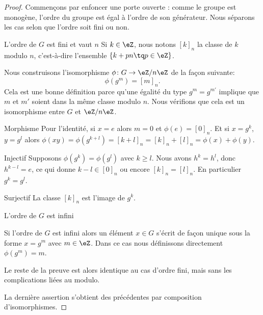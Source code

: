 \begin{proof}

    Commençons par enfoncer une porte ouverte : comme le groupe est monogène, l'ordre du groupe est égal à l'ordre de son générateur. Nous séparons les cas selon que l'ordre soit fini ou non.

    \begin{subproof}
        \item[L'ordre de \( G\) est fini et vaut \( n\)]
            Si \( k\in\eZ\), nous notons \( [k]_n\) la classe de \( k\) modulo \( n\), c'est-à-dire l'ensemble \( \{ k+pn\tq p\in \eZ \}\).

            Nous construisons l'isomorphisme \( \phi\colon G\to \eZ/n\eZ\) de la façon suivante:
            \begin{equation}
                \phi(g^m)=[m]_n.
            \end{equation}
            Cela est une bonne définition parce qu'une égalité du type \( g^m=g^{m'}\) implique que \( m\) et \( m'\) soient dans la même classe modulo \( n\). Nous vérifions que cela est un isomorphisme entre \( G\) et \( \eZ/n\eZ\).

            \begin{subproof}
            \item[Morphisme]
                Pour l'identité, si \( x=e\) alors \( m=0\) et \( \phi(e)=[0]_n\). Et si \( x=g^k\), \( y=g^l\) alors \( \phi(xy)=\phi(g^{k+l})=[k+l]_n=[k]_n+[l]_n=\phi(x)+\phi(y) \).
            \item[Injectif]
                Supposons \( \phi(g^k)=\phi(g^l)\) avec \( k\geq l\). Nous avons \( h^k=h^l\), donc \( h^{k-l}=e\), ce qui donne \( k-l\in [0]_n\) ou encore \( [k]_n=[l]_n\). En particulier \( g^k=g^l\).
            \item[Surjectif]
                La classe \( [k]_n\) est l'image de \( g^k\).
            \end{subproof}

        \item[L'ordre de \( G\) est infini]

                Si l'ordre de \( G\) est infini alors un élément \( x\in G\) s'écrit de façon unique sous la forme \( x=g^m\) avec \( m\in \eZ\). Dans ce cas nous définissons directement \( \phi(g^m)=m\).

                Le reste de la preuve est alors identique au cas d'ordre fini, mais sans les complications liées au modulo.

    \end{subproof}

    La dernière assertion s'obtient des précédentes par composition d'isomorphismes.

\end{proof}

